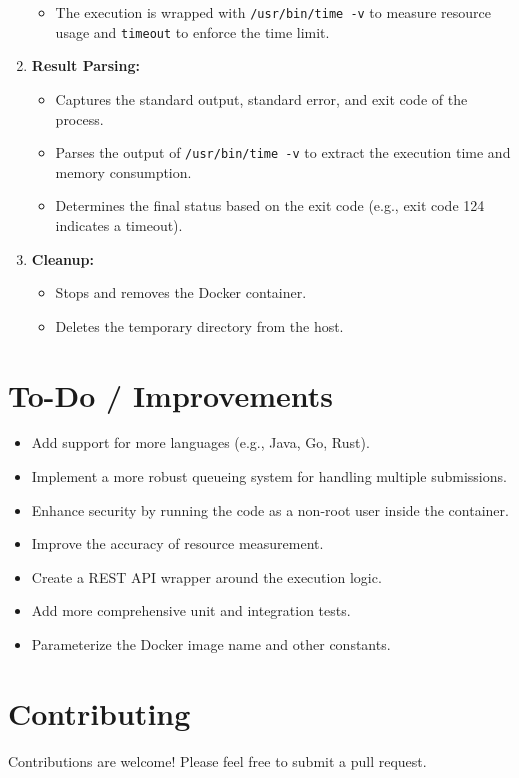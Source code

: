 \documentclass{article}
\begin{document}
\begin{enumerate}
\begin{itemize}
        \item The execution is wrapped with \texttt{/usr/bin/time -v} to measure resource usage and \texttt{timeout} to enforce the time limit.
    \end{itemize}
    \item \textbf{Result Parsing:}
    \begin{itemize}
        \item Captures the standard output, standard error, and exit code of the process.
        \item Parses the output of \texttt{/usr/bin/time -v} to extract the execution time and memory consumption.
        \item Determines the final status based on the exit code (e.g., exit code 124 indicates a timeout).
    \end{itemize}
    \item \textbf{Cleanup:}
    \begin{itemize}
        \item Stops and removes the Docker container.
        \item Deletes the temporary directory from the host.
    \end{itemize}
\end{enumerate}

\section{To-Do / Improvements}
\begin{itemize}[label={$\square$}]
    \item Add support for more languages (e.g., Java, Go, Rust).
    \item Implement a more robust queueing system for handling multiple submissions.
    \item Enhance security by running the code as a non-root user inside the container.
    \item Improve the accuracy of resource measurement.
    \item Create a REST API wrapper around the execution logic.
    \item Add more comprehensive unit and integration tests.
    \item Parameterize the Docker image name and other constants.
\end{itemize}

\section{Contributing}
Contributions are welcome! Please feel free to submit a pull request.
\end{document}
